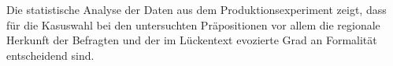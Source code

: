 Die statistische Analyse der Daten aus dem Produktionsexperiment zeigt, dass für die Kasuswahl bei den untersuchten Präpositionen vor allem die regionale Herkunft der Befragten und der im Lückentext evozierte Grad an Formalität entscheidend sind. 

%
%
